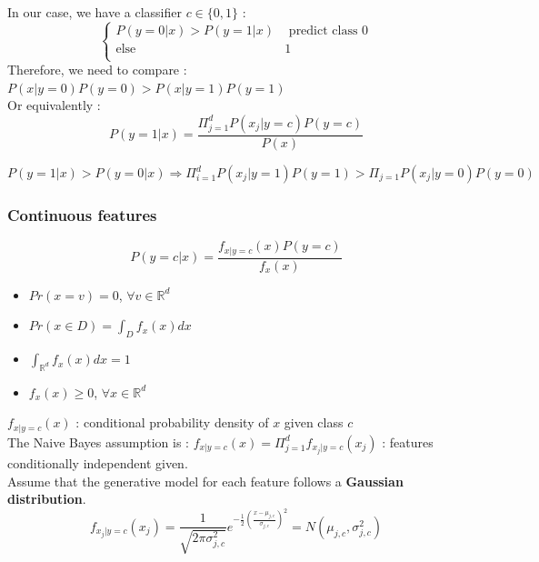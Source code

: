 \documentclass[../main.tex]{subfiles}
\begin{document}
In our case, we have a classifier $c\in \{0,1\}$ :\\
\begin{equation}
    \begin{cases}
        P(y=0\lvert x) > P(y=1\lvert x) & \text{ predict class 0}\\
        \text{else } & 1\\
    \end{cases}
\end{equation}
Therefore, we need to compare : $P(x\lvert y=0) P(y=0) > P(x\lvert y=1) P(y=1)$\\

Or equivalently : \\
\begin{equation}
    P(y=1\lvert x) = \frac{\Pi_{j=1}^d P(x_j \lvert y=c)P(y=c)}{P(x)}
\end{equation}

$P(y=1\lvert x)> P(y=0\lvert x) \Rightarrow \Pi_{i=1}^d P(x_j \lvert y=1) P(y=1) > \Pi_{j=1} P(x_j \lvert y=0)P(y=0)$\\

\subsubsection{Continuous features}
\begin{equation}
    P(y=c\lvert x) = \frac{f_{x\lvert y=c}(x) P(y=c)}{f_x(x)}
\end{equation}
\begin{itemize}
    \item $Pr(x=v) = 0$, $\forall v \in \mathbb{R}^d$\\
    \item $Pr(x\in D) = \int_D f_x(x)dx$\\
    \item $\int_{\mathbb{R}^d} f_x(x)dx =1$\\
    \item $f_x(x) \geq 0$, $\forall x \in \mathbb{R}^d$\\
\end{itemize}

$f_{x\lvert y=c}(x)$ : conditional probability density of $x$ given class $c$\\
The Naive Bayes assumption is : $f_{x\lvert y=c}(x) = \Pi_{j=1}^df_{x_j \lvert y=c}(x_j)$ : features conditionally independent given.\\

Assume that the generative model for each feature follows a \textbf{Gaussian distribution}. \\
\begin{equation}
    f_{x_j\lvert y=c} (x_j) = \frac{1}{\sqrt{2\pi \sigma_{j,c}^2}}e^{-\frac{1}{2}(\frac{x-\mu_{j,c}}{\sigma_{j,c}})^2} = N(\mu_{j,c}, \sigma_{j,c}^2)
\end{equation}
\end{document}
